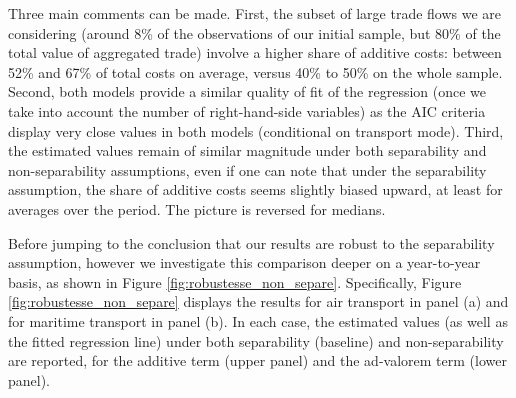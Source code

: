 \documentclass[a4paper,11pt]{article}
\begin{document}
Three main comments can be made. First, the subset of large trade flows we are considering (around 8\% of the observations of our initial sample, but 80\% of the total value of aggregated trade) involve a higher share of additive costs: between 52\% and 67\% of total costs on average, versus 40\% to 50\% on the whole sample.
Second, both models provide a similar quality of fit of the regression (once we take into account the number of right-hand-side variables) as the AIC criteria display very close values in both models (conditional on transport mode).
Third, the estimated values remain of similar magnitude under both separability and non-separability assumptions, even if one can note that under the separability assumption, the share of additive costs seems slightly biased upward, at least for averages over the period. The picture is reversed for medians.


Before jumping to the conclusion that our results are robust to the separability assumption, however we investigate this comparison deeper on a year-to-year basis, as shown in Figure \ref{fig:robustesse_non_separe}. Specifically, Figure \ref{fig:robustesse_non_separe} displays the results for air transport in panel (a) and for maritime transport in panel (b). In each case, the estimated values (as well as the fitted regression line) under both separability (baseline) and non-separability are reported, for the additive term (upper panel) and the ad-valorem term (lower panel).
\end{document}
